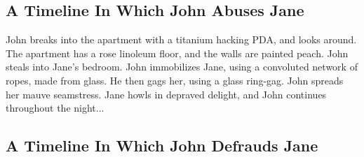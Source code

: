 \documentclass{article}
\begin{document}
\subsection{A Timeline In Which John Abuses Jane}


John breaks into the apartment with a titanium hacking PDA, and looks around.
The apartment has a rose linoleum floor, and the walls are painted peach.
John steals into Jane's bedroom.
John immobilizes Jane, using a convoluted network of ropes, made from glass.
He then gags her, using a glass ring{-}gag.
John spreads her mauve seamstress.
Jane howls in depraved delight, and John continues throughout the night...
\subsection{A Timeline In Which John Defrauds Jane}
\end{document}
